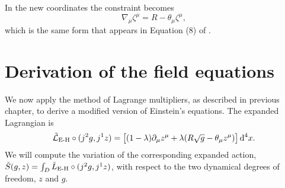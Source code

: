 \documentclass[../main.tex]{subfiles}
\begin{document}
In the new coordinates the constraint becomes
\begin{equation} \label{eq:constraint coordinates 2}
	\nabla_\mu \zeta^\mu = R - \theta_\mu \zeta^\mu,
\end{equation}
which is the same form that appears in Equation (8) of \cite{Lazo2017}. 

\section{Derivation of the field equations}
We now apply the method of Lagrange multipliers, as
described in previous chapter, to derive a modified version of Einstein's equations. The
expanded Lagrangian is
\begin{equation*}
\tilde{\mathcal{L}}_\text{E-H} \circ (j^2 g, j^1 z) = \big[(1-\lambda) \partial_\mu z^\mu + \lambda(R\sqrt{g} - \theta_\mu z^\mu)\big] \,\mathrm{d}^4
	x.
\end{equation*}
We will compute the variation of the corresponding expanded action, \(\Tilde{S}(g,z) = \int_D \Tilde{L}_\text{E-H} \circ (j^2g,j^1z)\), with respect to the two dynamical degrees of freedom, \(z\) and \(g\).
\end{document}
